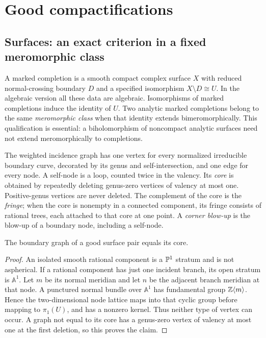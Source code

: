 \section{Good compactifications}
\label{sec:compactifications}

\subsection{Surfaces: an exact criterion in a fixed meromorphic class}

A marked completion is a smooth compact complex surface $X$ with
reduced normal-crossing boundary $D$ and a specified isomorphism
$X\setminus D\cong U$. In the algebraic version all these data are
algebraic. Isomorphisms of marked completions induce the identity
of $U$. Two analytic marked completions belong to the same
\emph{meromorphic class} when that identity extends bimeromorphically.
This qualification is essential: a biholomorphism of noncompact
analytic surfaces need not extend meromorphically to completions.

The weighted incidence graph has one vertex for every normalized
irreducible boundary curve, decorated by its genus and
self-intersection, and one edge for every node. A self-node is a
loop, counted twice in the valency. Its \emph{core} is obtained
by repeatedly deleting genus-zero vertices of valency at most
one. Positive-genus vertices are never deleted. The complement
of the core is the \emph{fringe}; when the core is nonempty in
a connected component, its fringe consists of rational trees,
each attached to that core at one point. A \emph{corner blow-up}
is the blow-up of a boundary node, including a self-node.

\begin{lemma}\label{P3a-core-necessity}
The boundary graph of a good surface pair equals its core.
\end{lemma}
\begin{proof}
An isolated smooth rational component is a $\mathbb P^1$ stratum and
is not aspherical. If a rational component has just one incident
branch, its open stratum is $\mathbb A^1$. Let $m$ be its normal
meridian and let $n$ be the adjacent branch meridian at that node.
A punctured normal bundle over $\mathbb A^1$ has fundamental
group $\mathbb Z\langle m\rangle$. Hence the two-dimensional node
lattice maps into that cyclic group before mapping to
$\pi _1(U)$, and has a nonzero kernel. Thus neither type of
vertex can occur. A graph not equal to its core has a
genus-zero vertex of valency at most one at the first deletion,
so this proves the claim.
\end{proof}

